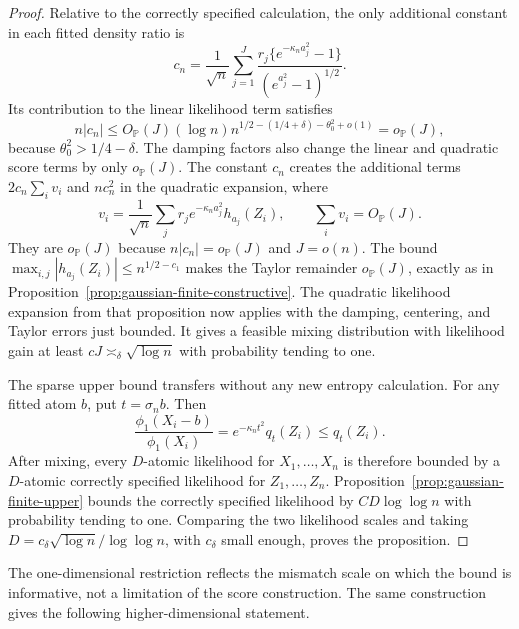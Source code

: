 \documentclass[11pt]{article}
\theoremstyle{definition}
\numberwithin{equation}{section}
\begin{document}
\begin{proof}
Relative to the correctly specified calculation, the only additional
constant in each fitted density ratio is
\[
    c_n=\frac1{\sqrt n}\sum_{j=1}^J
        \frac{r_j\{e^{-\kappa_na_j^2}-1\}}
             {(e^{a_j^2}-1)^{1/2}}.
\]
Its contribution to the linear likelihood term satisfies
\[
    n|c_n|
    \le O_{\mathbb P}(J)(\log n)
        n^{1/2-(1/4+\delta)-\theta_0^2+o(1)}
    =o_{\mathbb P}(J),
\]
because \(\theta_0^2>1/4-\delta\). The damping factors also change the
linear and quadratic score terms by only \(o_{\mathbb P}(J)\). The constant
\(c_n\) creates the additional terms
\(2c_n\sum_i v_i\) and \(nc_n^2\) in the quadratic expansion, where
\[
 v_i=\frac1{\sqrt n}\sum_j
 r_je^{-\kappa_na_j^2}h_{a_j}(Z_i),
 \qquad
 \sum_i v_i=O_{\mathbb P}(J).
\]
They are \(o_{\mathbb P}(J)\) because
\(n|c_n|=o_{\mathbb P}(J)\) and \(J=o(n)\). The bound
\(\max_{i,j}|h_{a_j}(Z_i)|\le n^{1/2-c_1}\) makes the Taylor remainder
\(o_{\mathbb P}(J)\), exactly
as in Proposition~\ref{prop:gaussian-finite-constructive}. The quadratic
likelihood expansion from that proposition now applies with the damping,
centering, and Taylor errors just bounded. It gives a feasible mixing
distribution with
likelihood gain at least \(cJ\asymp_\delta\sqrt{\log n}\) with probability
tending to one.

The sparse upper bound transfers without any new entropy calculation. For any
fitted atom \(b\), put \(t=\sigma_nb\). Then
\[
    \frac{\phi_1(X_i-b)}{\phi_1(X_i)}
    =e^{-\kappa_nt^2}q_t(Z_i)\le q_t(Z_i).
\]
After mixing, every \(D\)-atomic likelihood for \(X_1,\dots,X_n\) is therefore
bounded by a \(D\)-atomic correctly specified likelihood for
\(Z_1,\dots,Z_n\). Proposition~\ref{prop:gaussian-finite-upper} bounds the
correctly specified likelihood by \(CD\log\log n\) with probability tending
to one. Comparing the two
likelihood scales and taking
\(D=c_\delta\sqrt{\log n}/\log\log n\), with \(c_\delta\) small enough,
proves the proposition.
\end{proof}

The one-dimensional restriction reflects the mismatch scale on which the
bound is informative, not a limitation of the score construction. The same
construction gives the following higher-dimensional statement.
\end{document}
